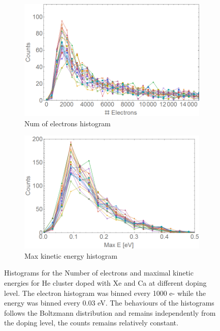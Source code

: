 \begin{figure}[h!]
\centering
\begin{subfigure}[l]{0.49\textwidth}\caption{Num of electrons histogram}
\includegraphics[width=1\textwidth]{../Images/results/MIR_He_XeCaDop/histoElectr.png} 
\end{subfigure}
\begin{subfigure}[l]{0.49\textwidth}\caption{Max kinetic energy histogram}
\includegraphics[width=1\textwidth]{../Images/results/MIR_He_XeCaDop/histoEnerg.png}   				\end{subfigure}
\caption[MIR He-Xe-Ca doping. Histogram]{Histograms for the Number of electrons and maximal kinetic energies for He cluster doped with Xe and Ca at different doping level. The electron histogram was binned every 1000 e- while the energy was binned every 0.03 eV. The behaviours of the histograms follows the Boltzmann distribution and remains independently from the doping level, the counts remains  relatively constant.}
\label{fig:XeCahisto}
\end{figure}

